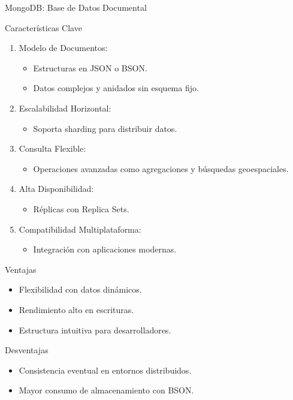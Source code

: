 \documentclass[presentation]{beamer}
\begin{document}
\begin{frame}[label={sec:org2994fa3}]{MongoDB: Base de Datos Documental}
\begin{block}{Características Clave}
\begin{enumerate}
\item \alert{\alert{Modelo de Documentos}}:
\begin{itemize}
\item Estructuras en JSON o BSON.
\item Datos complejos y anidados sin esquema fijo.
\end{itemize}
\item \alert{\alert{Escalabilidad Horizontal}}:
\begin{itemize}
\item Soporta \alert{\alert{sharding}} para distribuir datos.
\end{itemize}
\item \alert{\alert{Consulta Flexible}}:
\begin{itemize}
\item Operaciones avanzadas como agregaciones y búsquedas geoespaciales.
\end{itemize}
\item \alert{\alert{Alta Disponibilidad}}:
\begin{itemize}
\item Réplicas con Replica Sets.
\end{itemize}
\item \alert{\alert{Compatibilidad Multiplataforma}}:
\begin{itemize}
\item Integración con aplicaciones modernas.
\end{itemize}
\end{enumerate}
\end{block}

\begin{block}{Ventajas}
\begin{itemize}
\item Flexibilidad con datos dinámicos.
\item Rendimiento alto en escrituras.
\item Estructura intuitiva para desarrolladores.
\end{itemize}
\end{block}

\begin{block}{Desventajas}
\begin{itemize}
\item Consistencia eventual en entornos distribuidos.
\item Mayor consumo de almacenamiento con BSON.
\end{itemize}
\end{block}


\end{frame}
\end{document}
